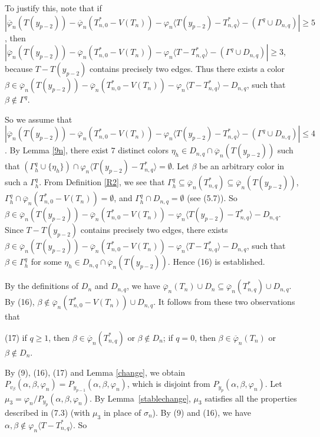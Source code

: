 \documentclass[11pt]{article}
\newcommand{\phibar}{\overline{\varphi}}
\begin{document}
To justify this, note that if $|\overline{\varphi}_n(T(y_{p-2}))- \phibar_n(T_{n,0}^*-V(T_n)) - \varphi_n \langle 
T(y_{p-2}) - T_{n,q}^* \rangle -(\Gamma^{q}\cup D_{n,q}) |\ge  5$, then 
$|\overline{\varphi}_n(T(y_{p-2}))- \phibar_n(T_{n,0}^*-V(T_n)) - \varphi_n \langle 
T - T_{n,q}^* \rangle - (\Gamma^{q}\cup D_{n,q}) |\ge 3$, because $T-T(y_{p-2})$ contains precisely two edges.
Thus there exists a color $\beta \in \overline{\varphi}_n(T(y_{p-2}))- \phibar_n(T_{n,0}^*-V(T_n)) - 
\varphi_n \langle T - T_{n,q}^* \rangle- D_{n,q}$, such that $\beta \notin \Gamma^{q}$.

So we assume that $|\overline{\varphi}_n(T(y_{p-2}))- \phibar_n(T_{n,0}^*-V(T_n)) - \varphi_n \langle 
T(y_{p-2}) - T_{n,q}^* \rangle - (\Gamma^{q}\cup D_{n,q}) |\le 4 $. By Lemma \ref{9n}, there exist $7$ distinct 
colors $\eta_{h}\in D_{n,q}\cap \phibar_n(T(y_{p-2}))$ such that  $(\Gamma^{q}_h \cup \{\eta_{h}\})
\cap \varphi_n \langle T(y_{p-2}) - T_{n,q}^* \rangle=\emptyset$. Let $\beta$ be an arbitrary color in such a
$\Gamma^{q}_h$. From Definition \ref{R2}, we see that $\Gamma^{q}_h \subseteq \overline{\varphi}_n(T_{n,q}^*)
\subseteq \overline{\varphi}_n(T(y_{p-2}))$,  $\Gamma^{q}_h \cap \phibar_n(T_{n,0}^*-V(T_n)) =\emptyset$,
and $\Gamma^{q}_h \cap D_{n,q} =\emptyset$ (see (5.7)). So $\beta \in \overline{\varphi}_n(T(y_{p-2}))- \phibar_n(T_{n,0}^*-V(T_n)) - 
\varphi_n \langle T(y_{p-2}) - T_{n,q}^* \rangle- D_{n,q}$. Since $T-T(y_{p-2})$ contains precisely two edges, there
exists $\beta \in \overline{\varphi}_n(T(y_{p-2}))- \phibar_n(T_{n,0}^*-V(T_n)) - \varphi_n \langle T - T_{n,q}^* 
\rangle- D_{n,q}$, such that $\beta \in \Gamma^{q}_h$ for some $\eta_h \in D_{n,q}\cap \phibar_n(T(y_{p-2}))$. 
Hence (16) is established.

By the definitions of $D_n$ and $D_{n,q}$, we have $\overline{\varphi}_n(T_n) \cup D_n \subseteq  
\overline{\varphi}_n(T_{n,q}^*) \cup D_{n,q}$. By (16), $\beta \notin \phibar_n(T_{n,0}^*-V(T_n)) \cup D_{n,q}$.
It follows from these two observations that 

(17) if $q\ge 1$, then $\beta \in \overline{\varphi}_n(T_{n,q}^*)$ or $\beta \notin D_n$; if $q=0$, then
$\beta \in \overline{\varphi}_n(T_n)$ or $\beta \notin D_n$.  

By (9), (16), (17) and Lemma \ref{change}, we obtain $P_{v_{\beta}}(\alpha,\beta,\varphi_n)=P_{y_{p-1}}(\alpha,\beta,\varphi_n)$,
which is disjoint from $P_{y_{p}}(\alpha,\beta,\varphi_n)$. Let $\mu_3=\varphi_n/P_{y_{p}}(\alpha,\beta,\varphi_n)$.
By Lemma~\ref{stablechange},  $\mu_3$ satisfies all the properties described in (7.3) (with $\mu_3$ in place of
$\sigma_n$). By (9) and (16), we have $\alpha, \beta \notin \varphi_n \langle T-T_{n,q}^* \rangle$. So
\end{document}
